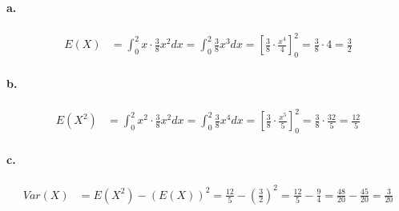 \paragraph*{a.}
\begin{align*}
    E(X) &= \int_0^2 x \cdot \frac{3}{8} x^2 dx = \int_0^2 \frac{3}{8} x^3 dx = \left[ \frac{3}{8} \cdot \frac{x^4}{4} \right]_0^2 = \frac{3}{8} \cdot 4 = \frac{3}{2}
\end{align*}

\paragraph*{b.}
\begin{align*}
    E(X^2) &= \int_0^2 x^2 \cdot \frac{3}{8} x^2 dx = \int_0^2 \frac{3}{8} x^4 dx = \left[ \frac{3}{8} \cdot \frac{x^5}{5} \right]_0^2 = \frac{3}{8} \cdot \frac{32}{5} = \frac{12}{5}
\end{align*}

\paragraph*{c.}
\begin{align*}
    Var(X) &= E(X^2) - (E(X))^2 = \frac{12}{5} - \left( \frac{3}{2} \right)^2 = \frac{12}{5} - \frac{9}{4} = \frac{48}{20} - \frac{45}{20} = \frac{3}{20}
\end{align*}